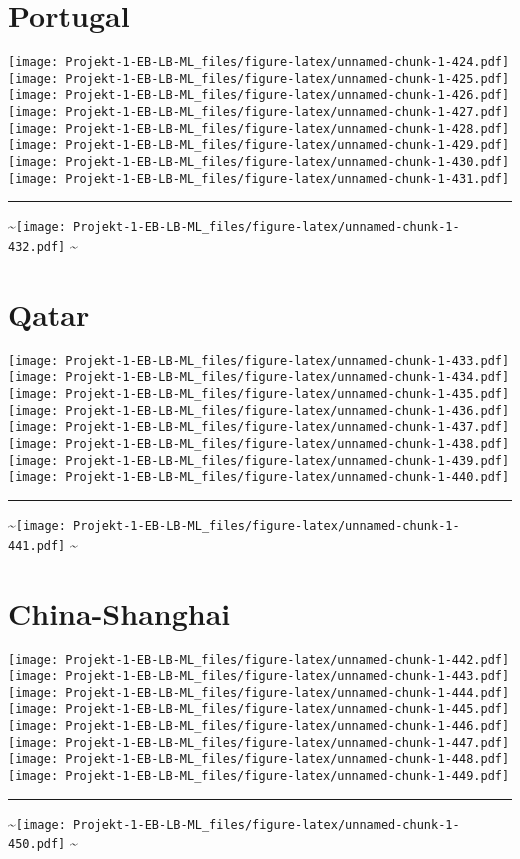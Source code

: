 \documentclass[]{article}
\begin{document}
\section{Portugal}\label{portugal}

\texttt{[image: Projekt-1-EB-LB-ML\_files/figure-latex/unnamed-chunk-1-424.pdf]}
\texttt{[image: Projekt-1-EB-LB-ML\_files/figure-latex/unnamed-chunk-1-425.pdf]}
\texttt{[image: Projekt-1-EB-LB-ML\_files/figure-latex/unnamed-chunk-1-426.pdf]}
\texttt{[image: Projekt-1-EB-LB-ML\_files/figure-latex/unnamed-chunk-1-427.pdf]}
\texttt{[image: Projekt-1-EB-LB-ML\_files/figure-latex/unnamed-chunk-1-428.pdf]}
\texttt{[image: Projekt-1-EB-LB-ML\_files/figure-latex/unnamed-chunk-1-429.pdf]}
\texttt{[image: Projekt-1-EB-LB-ML\_files/figure-latex/unnamed-chunk-1-430.pdf]}
\texttt{[image: Projekt-1-EB-LB-ML\_files/figure-latex/unnamed-chunk-1-431.pdf]}
\bigskip\hrule\bigskip
\textasciitilde{}\hfill\texttt{[image: Projekt-1-EB-LB-ML\_files/figure-latex/unnamed-chunk-1-432.pdf]}
\hfill \textasciitilde{} \vfill\eject

\section{Qatar}\label{qatar}

\texttt{[image: Projekt-1-EB-LB-ML\_files/figure-latex/unnamed-chunk-1-433.pdf]}
\texttt{[image: Projekt-1-EB-LB-ML\_files/figure-latex/unnamed-chunk-1-434.pdf]}
\texttt{[image: Projekt-1-EB-LB-ML\_files/figure-latex/unnamed-chunk-1-435.pdf]}
\texttt{[image: Projekt-1-EB-LB-ML\_files/figure-latex/unnamed-chunk-1-436.pdf]}
\texttt{[image: Projekt-1-EB-LB-ML\_files/figure-latex/unnamed-chunk-1-437.pdf]}
\texttt{[image: Projekt-1-EB-LB-ML\_files/figure-latex/unnamed-chunk-1-438.pdf]}
\texttt{[image: Projekt-1-EB-LB-ML\_files/figure-latex/unnamed-chunk-1-439.pdf]}
\texttt{[image: Projekt-1-EB-LB-ML\_files/figure-latex/unnamed-chunk-1-440.pdf]}
\bigskip\hrule\bigskip
\textasciitilde{}\hfill\texttt{[image: Projekt-1-EB-LB-ML\_files/figure-latex/unnamed-chunk-1-441.pdf]}
\hfill \textasciitilde{} \vfill\eject

\section{China-Shanghai}\label{china-shanghai}

\texttt{[image: Projekt-1-EB-LB-ML\_files/figure-latex/unnamed-chunk-1-442.pdf]}
\texttt{[image: Projekt-1-EB-LB-ML\_files/figure-latex/unnamed-chunk-1-443.pdf]}
\texttt{[image: Projekt-1-EB-LB-ML\_files/figure-latex/unnamed-chunk-1-444.pdf]}
\texttt{[image: Projekt-1-EB-LB-ML\_files/figure-latex/unnamed-chunk-1-445.pdf]}
\texttt{[image: Projekt-1-EB-LB-ML\_files/figure-latex/unnamed-chunk-1-446.pdf]}
\texttt{[image: Projekt-1-EB-LB-ML\_files/figure-latex/unnamed-chunk-1-447.pdf]}
\texttt{[image: Projekt-1-EB-LB-ML\_files/figure-latex/unnamed-chunk-1-448.pdf]}
\texttt{[image: Projekt-1-EB-LB-ML\_files/figure-latex/unnamed-chunk-1-449.pdf]}
\bigskip\hrule\bigskip
\textasciitilde{}\hfill\texttt{[image: Projekt-1-EB-LB-ML\_files/figure-latex/unnamed-chunk-1-450.pdf]}
\hfill \textasciitilde{} \vfill\eject
\end{document}

